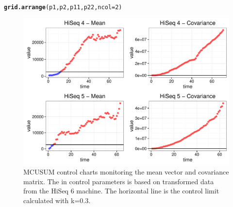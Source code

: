 \documentclass[a4paper,11pt,fleqn,twoside,notitlepage]{report}
\makeatletter
\def\maxwidth{ %
  \ifdim\Gin@nat@width>\linewidth
    \linewidth
  \else
    \Gin@nat@width
  \fi
}
\newcommand{\hlnum}[1]{\textcolor[rgb]{0.686,0.059,0.569}{#1}}%
\newcommand{\hlstd}[1]{\textcolor[rgb]{0.345,0.345,0.345}{#1}}%
\newcommand{\hlkwc}[1]{\textcolor[rgb]{0.333,0.667,0.333}{#1}}%
\newcommand{\hlkwd}[1]{\textcolor[rgb]{0.737,0.353,0.396}{\textbf{#1}}}%
\newenvironment{kframe}{%
 \def\at@end@of@kframe{}%
 \ifinner\ifhmode%
  \def\at@end@of@kframe{\end{minipage}}%
  \begin{minipage}{\columnwidth}%
 \fi\fi%
 \def\FrameCommand##1{\hskip\@totalleftmargin \hskip-\fboxsep
 \colorbox{shadecolor}{##1}\hskip-\fboxsep
     \hskip-\linewidth \hskip-\@totalleftmargin \hskip\columnwidth}%
 \MakeFramed {\advance\hsize-\width
   \@totalleftmargin\z@ \linewidth\hsize
   \@setminipage}}%
 {\par\unskip\endMakeFramed%
 \at@end@of@kframe}
\newenvironment{knitrout}{}{} %
\makeatother
\begin{document}
\begin{knitrout}
\begin{kframe}
\begin{alltt}
\hlkwd{grid.arrange}\hlstd{(p1,p2, p11,p22,} \hlkwc{ncol}\hlstd{=}\hlnum{2}\hlstd{)}
\end{alltt}
\end{kframe}\begin{figure}
\includegraphics[width=\maxwidth]{figure/HiSeq45MCUSUMfig-1} \caption[MCUSUM control charts monitoring the mean vector and covariance matrix]{MCUSUM control charts monitoring the mean vector and covariance matrix. The in control parameters is based on transformed data from the HiSeq 6 machine. The horizontal line is the control limit calculated with k=0.3.}\label{fig:HiSeq45MCUSUMfig}
\end{figure}


\end{knitrout}


\end{document}
